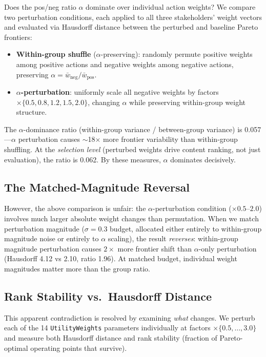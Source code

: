 \documentclass[11pt,letterpaper]{article}
\begin{document}
Does the pos/neg ratio $\alpha$ dominate over individual action
weights? We compare two perturbation conditions, each applied to all
three stakeholders' weight vectors and evaluated via Hausdorff
distance between the perturbed and baseline Pareto frontiers:

\begin{itemize}
  \item \textbf{Within-group shuffle} ($\alpha$-preserving): randomly
    permute positive weights among positive actions and negative
    weights among negative actions, preserving
    $\alpha = \bar{w}_{\text{neg}} / \bar{w}_{\text{pos}}$.
  \item \textbf{$\alpha$-perturbation}: uniformly scale all negative
    weights by factors $\times\{0.5, 0.8, 1.2, 1.5, 2.0\}$, changing
    $\alpha$ while preserving within-group weight structure.
\end{itemize}

The $\alpha$-dominance ratio (within-group variance / between-group
variance) is 0.057---$\alpha$ perturbation causes $\sim$18$\times$
more frontier variability than within-group shuffling. At the
\emph{selection level} (perturbed weights drive content ranking, not
just evaluation), the ratio is 0.062. By these measures, $\alpha$
dominates decisively.

\subsection{The Matched-Magnitude Reversal}

However, the above comparison is unfair: the $\alpha$-perturbation
condition ($\times 0.5$--$2.0$) involves much larger absolute weight
changes than permutation. When we match perturbation magnitude
($\sigma = 0.3$ budget, allocated either entirely to within-group
magnitude noise or entirely to $\alpha$ scaling), the result
\emph{reverses}: within-group magnitude perturbation causes
$2\times$ more frontier shift than $\alpha$-only perturbation
(Hausdorff 4.12 vs 2.10, ratio 1.96). At matched budget, individual
weight magnitudes matter more than the group ratio.

\subsection{Rank Stability vs.\ Hausdorff Distance}

This apparent contradiction is resolved by examining \emph{what}
changes. We perturb each of the 14 \texttt{UtilityWeights}
parameters individually at factors $\times\{0.5, \ldots, 3.0\}$ and
measure both Hausdorff distance and rank stability (fraction of
Pareto-optimal operating points that survive).
\end{document}
